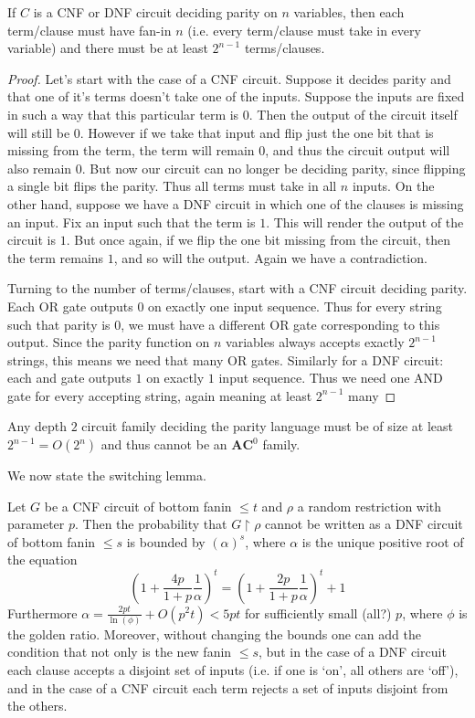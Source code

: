 \begin{fact}
	If $C$ is a CNF or DNF circuit deciding parity on $n$ variables, then each term/clause must have fan-in $n$ (i.e. every term/clause must take in every variable) and there must be at least $2^{n-1}$ terms/clauses.
\end{fact}
\begin{proof}
	Let's start with the case of a CNF circuit. Suppose it decides parity and that one of it's terms doesn't take one of the inputs. Suppose the inputs are fixed in such a way that this particular term is $0$. Then the output of the circuit itself will still be $0$. However if we take that input and flip just the one bit that is missing from the term, the term will remain $0$, and thus the circuit output will also remain $0$. But now our circuit can no longer be deciding parity, since flipping a single bit flips the parity. Thus all terms must take in all $n$ inputs. On the other hand, suppose we have a DNF circuit in which one of the clauses is missing an input. Fix an input such that the term is $1$. This will render the output of the circuit is $1$. But once again, if we flip the one bit missing from the circuit, then the term remains $1$, and so will the output. Again we have a contradiction. \par 
	Turning to the number of terms/clauses, start with a CNF circuit deciding parity. Each OR gate outputs $0$ on exactly one input sequence. Thus for every string such that parity is $0$, we must have a different OR gate corresponding to this output. Since the parity function on $n$ variables always accepts exactly $2^{n-1}$ strings, this means we need that many OR gates. Similarly for a DNF circuit: each and gate outputs $1$ on exactly $1$ input sequence. Thus we need one AND gate for every accepting string, again meaning at least $2^{n-1}$ many
\end{proof}
\begin{corollary}
	Any depth $2$ circuit family deciding the parity language must be of size at least $2^{n-1} = O(2^n)$ and thus cannot be an $\bm{AC}^0$ family. 
\end{corollary}
We now state the switching lemma. 
\begin{theorem}
	Let $G$ be a CNF circuit of bottom fanin $\leq t$ and $\rho$ a random restriction with parameter $p$. Then the probability that $G \restriction \rho$ cannot be written as a DNF circuit of bottom fanin $\leq s$ is bounded by $(\alpha)^s$, where $\alpha$ is the unique positive root of the equation
	\[ (1+\frac{4p}{1+p}\frac{1}{\alpha})^t = (1+\frac{2p}{1+p}\frac{1}{\alpha})^t+1 \]
Furthermore $\alpha = \frac{2pt}{\ln(\phi)} + O(p^2t) < 5pt$ for sufficiently small (all?) $p$, where $\phi$ is the golden ratio. Moreover, without changing the bounds one can add the condition that not only is the new fanin $\leq s$, but in the case of a DNF circuit each clause accepts a disjoint set of inputs (i.e. if one is `on', all others are `off'), and in the case of a CNF circuit each term rejects a set of inputs disjoint from the others.  
\end{theorem}
